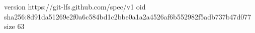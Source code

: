 version https://git-lfs.github.com/spec/v1
oid sha256:8d91da51269e2f0a6c584bd1c2bbe0a1a2a4526af6b552982f5adb737b47d077
size 63
